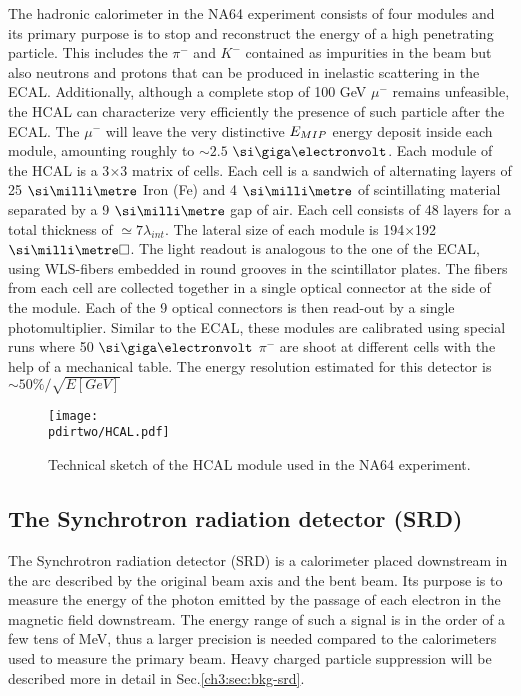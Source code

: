The hadronic calorimeter in the NA64 experiment consists of four modules and its primary purpose is to stop and reconstruct the energy of a high penetrating particle. This includes the $\pi^-$ and $K^-$ contained as impurities in the beam but also neutrons and protons that can be produced in inelastic scattering in the ECAL. Additionally, although a complete stop of 100 GeV $\mu^-$ remains unfeasible, the HCAL can characterize very efficiently the presence of such particle after the ECAL. The $\mu^-$ will leave the very distinctive $E_{MIP}$ energy deposit inside each module, amounting roughly to $\sim 2.5$ $\gev$. Each module of the HCAL is a 3$\times$3 matrix of cells. Each cell is a sandwich of alternating layers of 25 $\mmi$ Iron (Fe) and 4 $\mmi$ of scintillating material separated by a 9 $\mmi$ gap of air. Each cell consists of 48 layers for a total thickness of $\simeq 7\lambda_{int}$. The lateral size of each module is 194$\times$192 $\mms$. The light readout is analogous to the one of the ECAL, using WLS-fibers embedded in round grooves in the scintillator plates. The fibers from each cell are collected together in a single optical connector at the side of the module. Each of the 9 optical connectors is then read-out by a single photomultiplier. Similar to the ECAL, these modules are calibrated using special runs where 50 $\gev$ $\pi^-$ are shoot at different cells with the help of a mechanical table. The energy resolution estimated for this detector is $\sim 50\%/\sqrt{E[GeV]}$

\begin{figure}[bth!]
\centering
\texttt{[image: \\pdirtwo/HCAL.pdf]}
\caption[HCAL sketch]{Technical sketch of the HCAL module used in the NA64 experiment.}
\label{fig:hcal-sketch}
\end{figure}

\subsection{The Synchrotron radiation detector (SRD)}
\label{ch2:sec:detectors-srd}

The Synchrotron radiation detector (SRD) is a calorimeter placed downstream in the arc described by the original beam axis and the bent beam. Its purpose is to measure the energy of the photon emitted by the passage of each electron in the magnetic field downstream. The energy range of such a signal is in the order of a few tens of MeV, thus a larger precision is needed compared to the calorimeters used to measure the primary beam. Heavy charged particle suppression will be described more in detail in Sec.\ref{ch3:sec:bkg-srd}.

